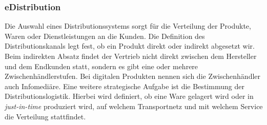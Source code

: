\subsubsection*{eDistribution}

Die Auswahl eines Distributionssystems sorgt für die Verteilung der Produkte,
Waren oder Dienstleistungen an die Kunden. Die Definition des Distributionskanals legt
fest, ob ein Produkt direkt oder indirekt abgesetzt wir. Beim indirekten Absatz
findet der Vertrieb nicht direkt zwischen dem Hersteller und dem Endkunden statt,
sondern es gibt eine oder mehrere Zwischenhändlerstufen. Bei digitalen Produkten
nennen sich die Zwischenhändler auch Infomediäre. Eine weitere strategische Aufgabe
ist die Bestimmung der Distributionslogistik. Hierbei wird definiert, ob eine Ware
gelagert wird oder in \emph{just-in-time} produziert wird, auf welchem Transportnetz und
mit welchem Service die Verteilung stattfindet.

